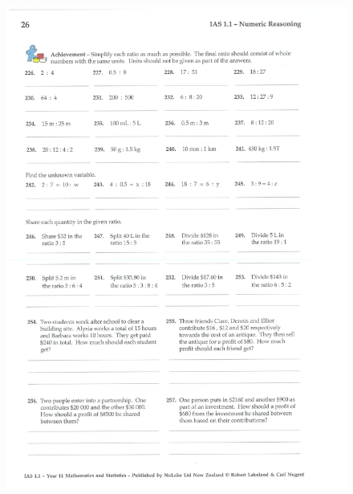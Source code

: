 \documentclass[a4paper,12pt]{article}
\begin{document}
\begin{figure}[!h]
	\centering
	\includegraphics[width=17cm]{Nulake_year10_forextension_ratio2}
\end{figure}
\end{document}
